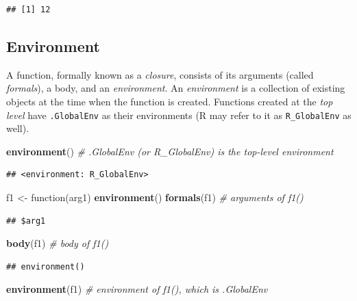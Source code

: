 \documentclass[]{book}
\newenvironment{Shaded}{\begin{snugshade}}{\end{snugshade}}
\newcommand{\KeywordTok}[1]{\textcolor[rgb]{0.13,0.29,0.53}{\textbf{{#1}}}}
\newcommand{\StringTok}[1]{\textcolor[rgb]{0.31,0.60,0.02}{{#1}}}
\newcommand{\CommentTok}[1]{\textcolor[rgb]{0.56,0.35,0.01}{\textit{{#1}}}}
\newcommand{\NormalTok}[1]{{#1}}
\theoremstyle{definition}
\theoremstyle{definition}
\theoremstyle{remark}
\begin{document}
\begin{verbatim}
## [1] 12
\end{verbatim}

\subsection{Environment}\label{environment}

A function, formally known as a \emph{closure}, consists of its
arguments (called \emph{formals}), a body, and an \emph{environment}. An
\emph{environment} is a collection of existing objects at the time when
the function is created. Functions created at the \emph{top level} have
\texttt{.GlobalEnv} as their environments (R may refer to it as
\texttt{R\_GlobalEnv} as well).

\begin{Shaded}
\begin{Highlighting}[]
\KeywordTok{environment}\NormalTok{()  }\CommentTok{# .GlobalEnv  (or R_GlobalEnv) is the top-level environment }
\end{Highlighting}
\end{Shaded}

\begin{verbatim}
## <environment: R_GlobalEnv>
\end{verbatim}

\begin{Shaded}
\begin{Highlighting}[]
\NormalTok{f1 <-}\StringTok{ }\NormalTok{function(arg1) }\KeywordTok{environment}\NormalTok{()  }
\KeywordTok{formals}\NormalTok{(f1)  }\CommentTok{# arguments of f1()}
\end{Highlighting}
\end{Shaded}

\begin{verbatim}
## $arg1
\end{verbatim}

\begin{Shaded}
\begin{Highlighting}[]
\KeywordTok{body}\NormalTok{(f1)     }\CommentTok{# body of f1()}
\end{Highlighting}
\end{Shaded}

\begin{verbatim}
## environment()
\end{verbatim}

\begin{Shaded}
\begin{Highlighting}[]
\KeywordTok{environment}\NormalTok{(f1)  }\CommentTok{# environment of f1(), which is .GlobalEnv }
\end{Highlighting}
\end{Shaded}
\end{document}
